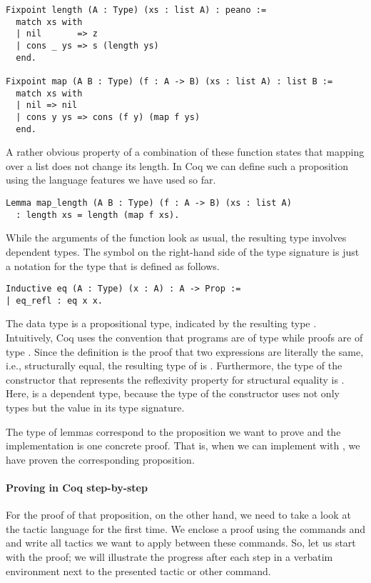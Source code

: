 \begin{verbatim}
Fixpoint length (A : Type) (xs : list A) : peano :=
  match xs with
  | nil       => z
  | cons _ ys => s (length ys)
  end.

Fixpoint map (A B : Type) (f : A -> B) (xs : list A) : list B :=
  match xs with
  | nil => nil
  | cons y ys => cons (f y) (map f ys)
  end.
\end{verbatim}

A rather obvious property of a combination of these function states that mapping over a list does not change its length.
In Coq we can define such a proposition using the language features we have used so far.

\begin{verbatim}
Lemma map_length (A B : Type) (f : A -> B) (xs : list A)
  : length xs = length (map f xs).
\end{verbatim}

While the arguments of the function  look as usual, the resulting type involves dependent types.
The symbol \cinl{=} on the right-hand side of the type signature is just a notation for the type  that is defined as follows.

\begin{verbatim}
Inductive eq (A : Type) (x : A) : A -> Prop :=
| eq_refl : eq x x.
\end{verbatim}

The data type  is a propositional type, indicated by the resulting type .
Intuitively, Coq uses the convention that programs are of type  while proofs are of type .
Since the definition  is the proof that two expressions are literally the same, i.e., structurally equal, the resulting type of  is .
Furthermore, the type of the constructor  that represents the reflexivity property for structural equality is .
Here,  is a dependent type, because the type of the constructor  uses not only types but the value  in its type signature.

The type of lemmas correspond to the proposition we want to prove and the implementation is one concrete proof.
That is, when we can implement  with , we have proven the corresponding proposition.

\paragraph{Proving in Coq step-by-step}
For the proof of that proposition, on the other hand, we need to take a look at the tactic language  for the first time.
We enclose a proof using the commands  and  and write all tactics we want to apply between these commands.
So, let us start with the proof; we will illustrate the progress after each step in a verbatim environment next to the presented tactic or other command.

